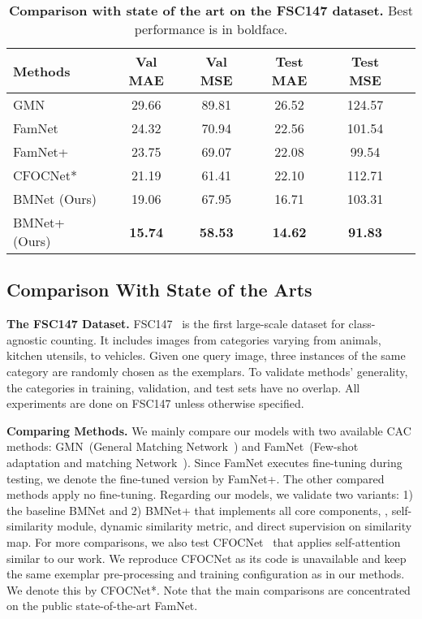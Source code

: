 \documentclass[10pt,twocolumn,letterpaper]{article}
\newcommand{\margin}{\vspace{3pt}\noindent}
\begin{document}
\begin{table}
	\centering
	\renewcommand{\arraystretch}{1.2} 
	\addtolength{\tabcolsep}{-4pt}
	\begin{tabular}{@{}lccccc@{}}
		\toprule
		Methods   & Val MAE & Val MSE & Test MAE & Test MSE \\ 
		\midrule
		GMN~\cite{gmn}       & 29.66   & 89.81   & 26.52 & 124.57      \\
		FamNet~\cite{famnet}    & 24.32   & 70.94   & 22.56  & 101.54  \\
		FamNet+~\cite{famnet}   & 23.75   & 69.07   & 22.08  & 99.54   \\
		CFOCNet*~\cite{cfocnet} & 21.19   & 61.41   & 22.10  & 112.71  \\
		BMNet (Ours) & 19.06 & 67.95 & 16.71 & 103.31 \\
		BMNet+ (Ours) & \textbf{15.74} & \textbf{58.53} & \textbf{14.62} & \textbf{91.83} \\ 
		\bottomrule
	\end{tabular}
	\vspace{-10pt}
	\caption{\textbf{Comparison with state of the art on the FSC147 dataset.} Best performance is in boldface.}
	\label{tab:comparison-CAC-methods}
	\vspace{-5pt}
\end{table}

\subsection{Comparison With State of the Arts}
\label{section:comparison-CAC-methods}

\noindent\textbf{The FSC147 Dataset.}
FSC147~\cite{famnet} is the first large-scale dataset for class-agnostic counting. It includes  images from  categories varying from animals, kitchen utensils, to vehicles. Given one query image, three instances of the same category are randomly chosen as the exemplars. To validate methods' generality, the categories in training, validation, and test sets have no overlap. All experiments are done on FSC147 unless otherwise specified.

\margin
\textbf{Comparing Methods.}
We mainly compare our models with two available CAC methods: GMN~(General Matching Network~\cite{gmn}) and FamNet~(Few-shot adaptation and matching Network~\cite{famnet}). Since FamNet executes fine-tuning during testing, we denote the fine-tuned version by FamNet+. The other compared methods apply no fine-tuning. Regarding our models, we validate two variants: 1) the baseline BMNet and 2) BMNet+ that implements all core components, \ie, self-similarity module, dynamic similarity metric, and direct supervision on similarity map.
For more comparisons, we also test CFOCNet~\cite{cfocnet} that applies self-attention similar to our work. We reproduce CFOCNet as its code is unavailable and keep the same exemplar pre-processing and training configuration as in our methods. We denote this by CFOCNet*.
Note that the main comparisons are concentrated on the public state-of-the-art FamNet.
\end{document}
